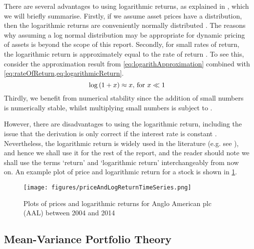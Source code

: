 There are several advantages to using logarithmic returns, as explained in \cite{QuaWp}, which we will briefly summarise.
Firstly, if we assume asset prices have a  distribution, then the logarithmic returns are conveniently normally distributed \cite{QuaWp}.
The reasons why assuming a log normal distribution may be appropriate for dynamic pricing of assets is beyond the scope of this report.
Secondly, for small rates of return, the logarithmic return is approximately equal to the rate of return \cite{QuaWp}.
To see this, consider the approximation result from \cref{eq:logarithApproximation} combined with \cref{eq:rateOfReturn,eq:logarithmicReturn}.
\begin{equation}
	\label{eq:logarithApproximation}
	\log \left( 1 + x \right) \approx x \text{, for } x \ll 1
\end{equation}
Thirdly, we benefit from numerical stability since the addition of small numbers is numerically stable, whilst multiplying small numbers is subject to  \cite{QuaWp}.

However, there are disadvantages to using the logarithmic return, including the issue that the derivation is only correct if the interest rate is constant \cite{QuaWp,Onn02}.
Nevertheless, the logarithmic return is widely used in the literature (e.g. see \cite{Onn02,OCK+02,OKK03,FPM+10,FPW+11,MG13}), and hence we shall use it for the rest of the report, and the reader should note we shall use the terms `return' and `logarithmic return' interchangeably from now on.
An example plot of price and logarithmic return for a stock is shown in \cref{fig:priceAndLogReturn}.

\begin{figure}
	\centering
	\texttt{[image: figures/priceAndLogReturnTimeSeries.png]}
	\caption[Example plot for price and logarithmic return]{\label{fig:priceAndLogReturn} Plots of prices and logarithmic returns for Anglo American plc (AAL) between 2004 and 2014}
\end{figure}


\subsection{Mean-Variance Portfolio Theory}
\label{subsec:portfolioTheoryBackground}

